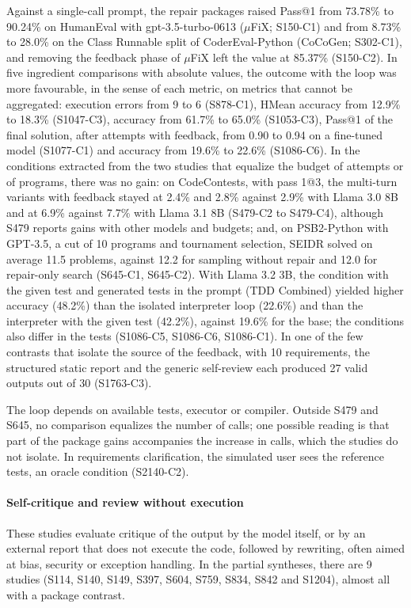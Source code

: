 Against a single-call prompt, the repair packages raised Pass@1 from 73.78\% to 90.24\% on HumanEval with gpt-3.5-turbo-0613 ($\mu$FiX; S150-C1) and from 8.73\% to 28.0\% on the Class Runnable split of CoderEval-Python (CoCoGen; S302-C1), and removing the feedback phase of $\mu$FiX left the value at 85.37\% (S150-C2).
In five ingredient comparisons with absolute values, the outcome with the loop was more favourable, in the sense of each metric, on metrics that cannot be aggregated: execution errors from 9 to 6 (S878-C1), HMean accuracy from 12.9\% to 18.3\% (S1047-C3), accuracy from 61.7\% to 65.0\% (S1053-C3), Pass@1 of the final solution, after attempts with feedback, from 0.90 to 0.94 on a fine-tuned model (S1077-C1) and accuracy from 19.6\% to 22.6\% (S1086-C6).
In the conditions extracted from the two studies that equalize the budget of attempts or of programs, there was no gain: on CodeContests, with pass 1@3, the multi-turn variants with feedback stayed at 2.4\% and 2.8\% against 2.9\% with Llama 3.0 8B and at 6.9\% against 7.7\% with Llama 3.1 8B (S479-C2 to S479-C4), although S479 reports gains with other models and budgets; and, on PSB2-Python with GPT-3.5, a cut of 10 programs and tournament selection, SEIDR solved on average 11.5 problems, against 12.2 for sampling without repair and 12.0 for repair-only search (S645-C1, S645-C2).
With Llama 3.2 3B, the condition with the given test and generated tests in the prompt (TDD Combined) yielded higher accuracy (48.2\%) than the isolated interpreter loop (22.6\%) and than the interpreter with the given test (42.2\%), against 19.6\% for the base; the conditions also differ in the tests (S1086-C5, S1086-C6, S1086-C1).
In one of the few contrasts that isolate the source of the feedback, with 10 requirements, the structured static report and the generic self-review each produced 27 valid outputs out of 30 (S1763-C3).

The loop depends on available tests, executor or compiler. Outside S479 and S645, no comparison equalizes the number of calls; one possible reading is that part of the package gains accompanies the increase in calls, which the studies do not isolate. In requirements clarification, the simulated user sees the reference tests, an oracle condition (S2140-C2).

\paragraph{Self-critique and review without execution}
These studies evaluate critique of the output by the model itself, or by an external report that does not execute the code, followed by rewriting, often aimed at bias, security or exception handling. In the partial syntheses, there are 9 studies (S114, S140, S149, S397, S604, S759, S834, S842 and S1204), almost all with a package contrast.

